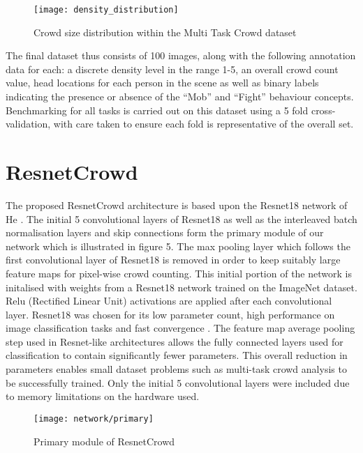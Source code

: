 \documentclass[10pt,twocolumn,letterpaper]{article}
\begin{document}
\begin{figure}[h!]
	\centering
	\texttt{[image: density\_distribution]}
	\caption{Crowd size distribution within the Multi Task Crowd dataset}
    \label{density_distribution}
\end{figure}







The final dataset thus consists of 100 images, along with the following annotation data for each: a discrete density level in the range 1-5, an overall crowd count value, head locations for each person in the scene as well as binary labels indicating the presence or absence of the ``Mob'' and ``Fight'' behaviour concepts. Benchmarking for all tasks is carried out on this dataset using a 5 fold cross-validation, with care taken to ensure each fold is representative of the overall set.


\section{ResnetCrowd}
The proposed ResnetCrowd architecture is based upon the Resnet18 network of He \etal \cite{he2016deep}. The initial 5 convolutional layers of Resnet18 as well as the interleaved batch normalisation \cite{ioffe2015batch} layers and skip connections form the primary module of our network which is illustrated in figure 5. The max pooling layer which follows the first convolutional layer of Resnet18 is removed in order to keep suitably large feature maps for pixel-wise crowd counting.  This initial portion of the network is initalised with weights from a Resnet18 network trained on the ImageNet dataset. Relu (Rectified Linear Unit) activations are applied after each convolutional layer. Resnet18 was chosen for its low parameter count, high performance on image classification tasks and fast convergence \cite{he2016deep}. The feature map average pooling step used in Resnet-like architectures allows the fully connected layers used for classification to contain significantly fewer parameters. This overall reduction in parameters enables small dataset problems such as multi-task crowd analysis to be successfully trained. Only the initial 5 convolutional layers were included due to memory limitations on the hardware used.

\begin{figure}[h!]
	\centering
	\texttt{[image: network/primary]}
	\label{bla}
    \caption{Primary module of ResnetCrowd}
\end{figure}
\end{document}
